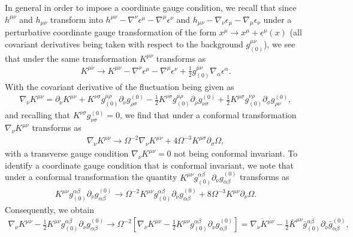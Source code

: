\documentclass[aps]{revtex4}
\begin{document}
In general in order to impose a coordinate gauge condition, we recall that since $h^{\mu\nu}$ and $h_{\mu\nu}$ transform into $h^{\mu\nu}-\nabla^{\nu}\epsilon^{\mu}-\nabla^{\mu}\epsilon^{\nu}$ and $h_{\mu\nu}-\nabla_{\nu}\epsilon_{\mu}-\nabla_{\mu}\epsilon_{\nu}$ under a perturbative coordinate gauge transformation of the form $x^{\mu}\rightarrow x^{\mu}+\epsilon^{\mu}(x)$ (all covariant derivatives being taken with respect to the background $g_{(0)}^{\mu\nu}$), we see that under the same transformation $K^{\mu\nu}$ transforms as  
%
\begin{eqnarray}
K^{\mu\nu}\rightarrow K^{\mu\nu}-\nabla^{\nu}\epsilon^{\mu}-\nabla^{\mu}\epsilon^{\nu}+\frac{1}{2}g_{(0)}^{\mu\nu}\nabla_{\alpha}\epsilon^{\alpha}.
\label{AP17}
\end{eqnarray}
% 
With the covariant derivative of the fluctuation being given as  
%
\begin{eqnarray}
\nabla_{\nu}K^{\mu\nu}=
\partial_{\nu}K^{\mu\nu}
+K^{\nu\sigma}g_{(0)}^{\mu\rho}\partial_{\nu}g^{(0)}_{\rho\sigma}
-\frac{1}{2}K^{\nu\sigma}g_{(0)}^{\mu\rho}\partial_{\rho}g^{(0)}_{\nu\sigma}
+\frac{1}{2}K^{\mu\sigma}g_{(0)}^{\nu\rho}\partial_{\sigma}g^{(0)}_{\rho\nu},
\label{AP18}
\end{eqnarray}
% 
and recalling that $K^{\nu\sigma}g^{(0)}_{\nu\sigma}=0$, we find that under a conformal transformation $\nabla_{\nu}K^{\mu\nu}$ transforms as
%
\begin{eqnarray}
\nabla_{\nu}K^{\mu\nu}\rightarrow \Omega^{-2}\nabla_{\nu}K^{\mu\nu}+4\Omega^{-3}K^{\mu\sigma}\partial_{\sigma}\Omega,
\label{AP19}
\end{eqnarray}
% 
with a transverse gauge condition $\nabla_{\nu}K^{\mu\nu}=0$ not being conformal invariant. To identify a coordinate gauge condition that is conformal invariant, we note that under a conformal transformation the quantity $K^{\mu\nu}g_{(0)}^{\alpha\beta}\partial_{\nu}g^{(0)}_{\alpha\beta}$ transforms as
%
\begin{eqnarray}
K^{\mu\nu}g_{(0)}^{\alpha\beta}\partial_{\nu}g^{(0)}_{\alpha\beta}
\rightarrow \Omega^{-2}K^{\mu\nu}g_{(0)}^{\alpha\beta}\partial_{\nu}g^{(0)}_{\alpha\beta}
+8\Omega^{-3}K^{\mu\nu}\partial_{\nu}\Omega.
\label{AP20}
\end{eqnarray}
%
Consequently, we obtain
%
\begin{eqnarray}
\nabla_{\nu}K^{\mu\nu}-\frac{1}{2} K^{\mu\nu}g_{(0)}^{\alpha\beta}\partial_{\nu}g^{(0)}_{\alpha\beta}\rightarrow \Omega^{-2}\left[\nabla_{\nu}K^{\mu\nu}
-\frac{1}{2} K^{\mu\nu}g_{(0)}^{\alpha\beta}\partial_{\nu}g^{(0)}_{\alpha\beta}\right]
=\overline{\nabla_{\nu}K^{\mu\nu}}-\frac{1}{2} \bar{K}^{\mu\nu}\bar{g}_{(0)}^{\alpha\beta}\partial_{\nu}\bar{g}^{(0)}_{\alpha\beta},
\label{AP21}
\end{eqnarray}
\end{document}
